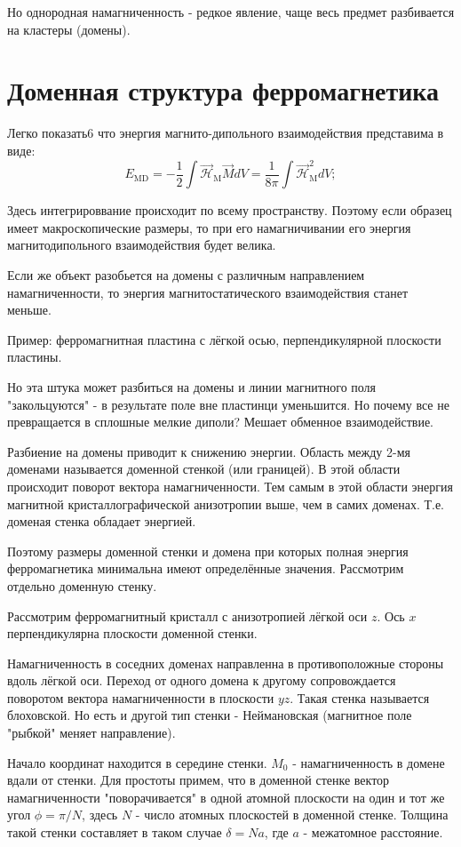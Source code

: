 \documentclass[a4paper, 14pt, russian]{article}
\newcommand{\be}{\begin{equation}}
\newcommand{\ee}{\end{equation}}
\begin{document}
	Но однородная намагниченность - редкое явление, чаще весь предмет разбивается
	на кластеры (домены). 
	
	\section{Доменная структура ферромагнетика}

	Легко показать6 что энергия магнито-дипольного взаимодействия представима в виде:
	\be
		\label{eq146}
		E_\text{MD} = - \frac{1}{2} \int \vec{\mathcal H}_\text{M} \vec M dV = 
			\frac{1}{8\pi} \int \vec{\mathcal H}_\text{M}^2 dV;
	\ee

	Здесь интегрироввание происходит по всему пространству. Поэтому если 
	образец имеет макроскопические размеры, то при его намагничивании его энергия 
	магнитодипольного взаимодействия будет велика.

	Если же объект разобьется на домены с различным направлением намагниченности, 
	то энергия магнитостатического взаимодействия станет меньше.

	Пример: ферромагнитная пластина с лёгкой осью, перпендикулярной плоскости пластины.

	Но эта штука может разбиться на домены и линии магнитного поля "закольцуются" - 
	в результате поле вне пластинци уменьшится. Но почему все не превращается в сплошные
	мелкие диполи? Мешает обменное взаимодействие.

	Разбиение на домены приводит к снижению энергии. Область между 2-мя доменами
	называется доменной стенкой (или границей). В этой области происходит
	поворот вектора намагниченности. Тем самым в этой области энергия магнитной
	кристаллографической анизотропии выше, чем в самих доменах.
	Т.е. доменая стенка обладает энергией.

	Поэтому размеры доменной стенки и домена при которых полная энергия ферромагнетика
	минимальна имеют определённые значения. Рассмотрим отдельно доменную стенку.

	Рассмотрим ферромагнитный кристалл с анизотропией лёгкой оси $z$. Ось $x$
	перпендикулярна плоскости доменной стенки.

	Намагниченность в  соседних доменах направленна в противоположные стороны вдоль 
	лёгкой оси. Переход от одного домена к другому сопровождается
	поворотом вектора намагниченности в плоскости $yz$. Такая стенка
	называется блоховской. Но есть и другой тип стенки - Неймановская (магнитное поле
	"рыбкой" меняет направление).

	Начало координат находится в середине стенки. $M_0$ - намагниченность
	в домене вдали от стенки. Для простоты примем, что в доменной стенке 
	вектор намагниченности "поворачивается" в одной атомной плоскости на один и 
	тот же угол $\phi = \pi / N$, здесь $N$ - число атомных плоскостей
	в доменной стенке. Толщина такой стенки составляет в таком случае $\delta = N a$, где
	$a$  - межатомное расстояние.
\end{document}
